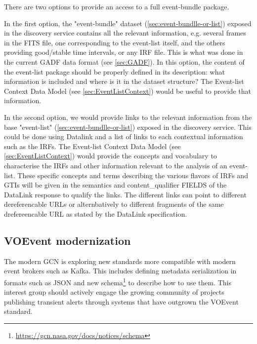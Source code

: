 \documentclass[11pt,a4paper]{ivoa}
\begin{document}
{There are two options to provide an access to a full event-bundle package.

In the first option, the "event-bundle" dataset (\ref{sec:event-bundlle-or-list}) exposed in the discovery service  contains all the relevant information, e.g. several frames in the \gls{FITS} file, one corresponding to the event-list itself, and the others providing good/stable time intervals, or any \gls{IRF} file. This is what was done in the current \gls{GADF} data format (see \ref{sec:GADF}). In this option, the content of the event-list package should be properly defined in its description: what information is included and where is it in the dataset structure? The Event-list Context Data Model (see \ref{sec:EventListContext}) would be useful to provide that information.

In the second option, we would provide links to the relevant information from the base "event-list" (\ref{sec:event-bundlle-or-list}) exposed in the discovery service. This could be done using Datalink and a list of links to each contextual information such as the \gls{IRF}s. The Event-list Context Data Model (see \ref{sec:EventListContext}) would provide the concepts and vocabulary to characterise the \gls{IRF}s and other information relevant to the analysis of an event-list. These specific concepts and terms describing the various flavors of \gls{IRF}s and \gls{GTI}s will be given in the semantics and content\_qualifier FIELDS of the DataLink response to qualify the links. The different links can point to different
dereferencable URLs or alternbatively to different fragments of the same drefereencable URL as stated by the DataLink specification.

\subsection{VOEvent modernization}

The modern GCN is exploring new standards more compatible with modern event brokers such as Kafka. This includes defining metadata serialization in formats such as JSON and new schema\footnote{\url{https://gcn.nasa.gov/docs/notices/schema}} to describe how to use them.  This interest group should actively engage the growing community of projects publishing transient alerts through systems that have outgrown the VOEvent standard.  


\printglossaries

}
\end{document}
